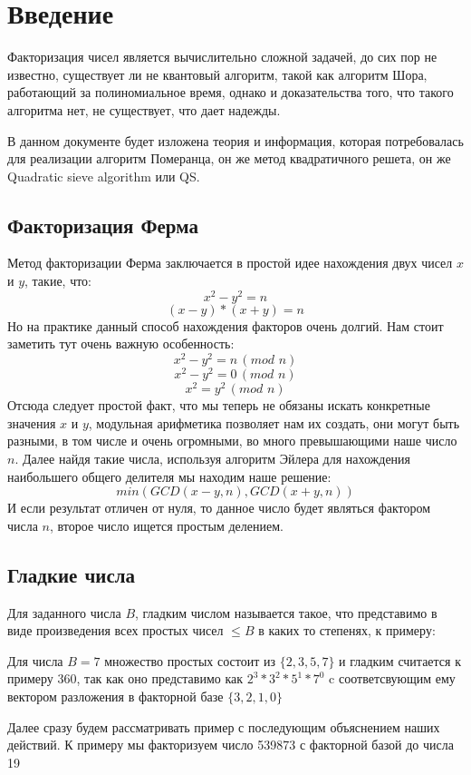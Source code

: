 \section{Введение}

Факторизация чисел является вычислительно сложной задачей, до сих пор не известно, существует ли не квантовый алгоритм, такой как алгоритм Шора, работающий за полиномиальное время, однако и доказательства того, что такого алгоритма нет, не существует, что дает надежды.

В данном документе будет изложена теория и информация, которая потребовалась для реализации алгоритм Померанца, он же метод квадратичного решета, он же Quadratic sieve algorithm или QS.

\subsection{Факторизация Ферма}

Метод факторизации Ферма заключается в простой идее нахождения двух чисел $x$ и $y$, такие, что:
$$
x^2 - y^2 = n
$$
$$
(x-y)*(x+y) = n
$$
Но на практике данный способ нахождения факторов очень долгий. Нам стоит заметить тут очень важную особенность:
$$
x^2 - y^2 = n \,(mod\,\,n)
$$
$$
x^2 - y^2 = 0 \,(mod\,\,n)
$$
$$
x^2 = y^2 \,(mod\,\,n)
$$
Отсюда следует простой факт, что мы теперь не обязаны искать конкретные значения $x$ и $y$, модульная арифметика позволяет нам их создать, они могут быть разными, в том числе и очень огромными, во много превышающими наше число $n$.
Далее найдя такие числа, используя алгоритм Эйлера для нахождения наибольшего общего делителя мы находим наше решение:
$$
min(GCD(x-y,n),GCD(x+y,n))
$$
И если результат отличен от нуля, то данное число будет являться фактором числа $n$, второе число ищется простым делением.

\subsection{Гладкие числа}

Для заданного числа $B$, гладким числом называется такое, что представимо в виде произведения всех простых чисел $\leq B$ в каких то степенях, к примеру:

Для числа $B=7$ множество простых состоит из $\{2,3,5,7\}$ и гладким считается к примеру 360, так как оно представимо как $2^3*3^2*5^1*7^0$ c соответсвующим ему вектором разложения в факторной базе $\{3,2,1,0\}$

Далее сразу будем рассматривать пример с последующим объяснением наших действий. К примеру мы факторизуем число 539873 с факторной базой до числа 19

